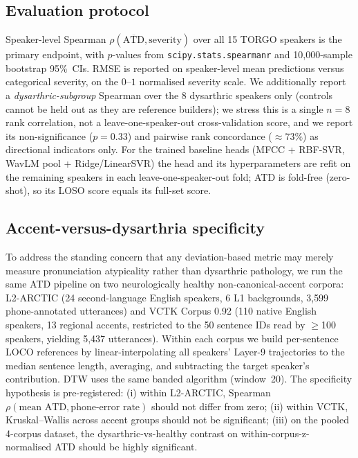 \subsection{Evaluation protocol}
Speaker-level Spearman $\rho(\overline{\mathrm{ATD}}, \mathrm{severity})$
over all 15 TORGO speakers is the primary endpoint, with $p$-values from
\texttt{scipy.stats.spearmanr} and 10{,}000-sample bootstrap 95\%~CIs.
RMSE is reported on speaker-level mean predictions versus categorical
severity, on the $0$--$1$ normalised severity scale. We additionally
report a \emph{dysarthric-subgroup} Spearman over the 8 dysarthric
speakers only (controls cannot be held out as they are reference
builders); we stress this is a single $n = 8$ rank correlation, not a
leave-one-speaker-out cross-validation score, and we report its
non-significance ($p = 0.33$) and pairwise rank concordance ($\approx
73\%$) as directional indicators only. For the trained baseline heads
(MFCC + RBF-SVR, WavLM pool + Ridge/LinearSVR) the head and its
hyperparameters are refit on the remaining speakers in each
leave-one-speaker-out fold; ATD is fold-free (zero-shot), so its LOSO score
equals its full-set score.

\subsection{Accent-versus-dysarthria specificity}
To address the standing concern that any deviation-based metric may
merely measure pronunciation atypicality rather than dysarthric
pathology, we run the same ATD pipeline on two neurologically healthy
non-canonical-accent corpora: L2-ARCTIC (24 second-language English
speakers, 6 L1 backgrounds, 3{,}599 phone-annotated utterances) and
VCTK Corpus 0.92 (110 native English speakers, 13 regional accents,
restricted to the 50 sentence IDs read by $\geq$100 speakers, yielding
5{,}437 utterances). Within each corpus we build per-sentence LOCO
references by linear-interpolating all speakers' Layer-9 trajectories
to the median sentence length, averaging, and subtracting the target
speaker's contribution. DTW uses the same banded algorithm
(window~20). The specificity hypothesis is pre-registered: (i)
within L2-ARCTIC, Spearman $\rho(\text{mean ATD},\text{phone-error
rate})$ should not differ from zero; (ii) within VCTK, Kruskal--Wallis
across accent groups should not be significant; (iii) on the pooled
4-corpus dataset, the dysarthric-vs-healthy contrast on
within-corpus-z-normalised ATD should be highly significant.

